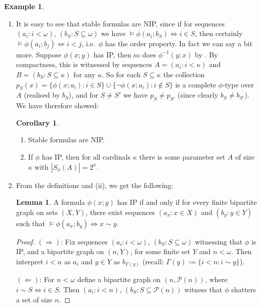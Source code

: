 \documentclass[a4paper]{report}
\newcommand{\PS}{\mathcal{P}}
\renewcommand{\implies}{\Rightarrow}
\renewcommand{\iff}{\Leftrightarrow}
\theoremstyle{definition}
\newtheorem{lem}[thm]{Lemma}
\newtheorem{cor}[thm]{Corollary}
\newtheorem{exmp}[thm]{Example}
\theoremstyle{remstyle}
\begin{document}
\begin{exmp}\label{nipformex}\
	\begin{enumerate}[itemsep=12pt]
		\item It is easy to see that stable formulas are NIP, since if for sequences $(a_i:i<\omega)$, $(b_S:S\subseteq\omega)$ we have $\models\phi(a_i;b_S)\iff i\in S$, then certainly $\models\phi(a_i;b_j)\iff i<j$, i.e.\ $\phi$ has the order property. In fact we can say a bit more. Suppose $\phi(x;y)$ has IP, then so does $\phi^{-1}(y;x)$ by . By compactness, this is witnessed by sequences $A=(a_i:i<\kappa)$ and $B=(b_S:S\subseteq\kappa)$ for any $\kappa$. So for each $S\subseteq\kappa$ the collection $p_S(x)=\{\phi(x;a_i):i\in S\}\cup\{\neg\phi(x;a_i):i\not\in S\}$ is a complete $\phi$-type over $A$ (realised by $b_S$), and for $S\neq S'$ we have $p_S\neq p_{S'}$ (since clearly $b_S\neq b_{S'}$). We have therefore showed:

		      \begin{cor}\label{stable->nip}\
			      \begin{enumerate}
				      \item Stable formulas are NIP.
				      \item If $\phi$ has IP, then for all cardinals $\kappa$ there is some parameter set $A$ of size $\kappa$ with $|S_{\phi}(A)|=2^{\kappa}$.
			      \end{enumerate}
		      \end{cor}

		\item From the definitions and  (ii), we get the following:
		      \begin{lem}
			      A formula $\phi(x;y)$ has IP if and only if for every finite bipartite graph on sets $(X,Y)$, there exist sequences $(a_x:x\in X)$ and $(b_y:y\in Y)$ such that $\models\phi(a_x;b_y)\iff x\sim y$.
		      \end{lem}
		      \begin{proof}
			      $(\implies)$: Fix sequences $(a_i:i<\omega)$, $(b_S:S\subseteq \omega)$ witnessing that $\phi$ is IP, and a bipartite graph on $(n,Y)$, for some finite set $Y$ and $n<\omega$. Then interpret $i<n$ as $a_i$ and $y\in Y$ as $b_{\Gamma(y)}$ (recall: $\Gamma(y) :=\{i<n:i\sim y\}$).

			      $(\Leftarrow)$: For $n<\omega$ define a bipartite graph on $(n,\PS(n))$, where $i\sim S\iff i\in S$. Then $(a_i:i<n)$, $(b_S:S\subseteq \PS(n))$ witness that $\phi$ shatters a set of size $n$.
		      \end{proof}


\end{enumerate}
\end{exmp}
\end{document}
